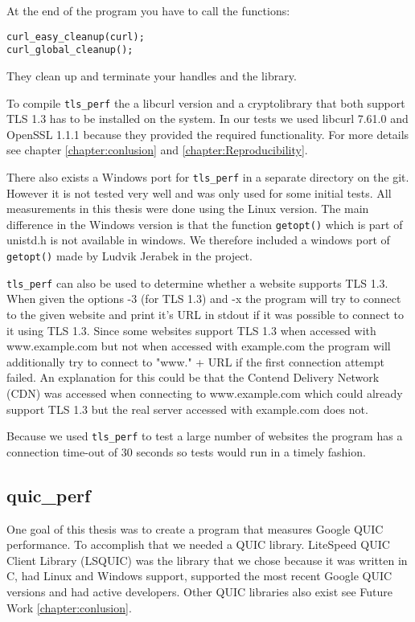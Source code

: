 At the end of the program you have to call the functions:
\begin{lstlisting}
curl_easy_cleanup(curl);
curl_global_cleanup();
\end{lstlisting}
They clean up and terminate your handles and the library.

To compile  \texttt{tls\_perf} the a libcurl version and a cryptolibrary that both support TLS 1.3 has to be installed on the system.
In our tests we used libcurl 7.61.0 and OpenSSL 1.1.1 because they provided the required functionality. For more details see chapter  \ref{chapter:conlusion} and \ref{chapter:Reproducibility}.

There also exists a Windows port for  \texttt{tls\_perf} in a separate directory on the git.
However it is not tested very well and was only used for some initial tests.
All measurements in this thesis were done using the Linux version.
The main difference in the Windows version is that the function \verb|getopt()| which is part of unistd.h is not available in windows.
We therefore included a windows port of \verb|getopt()| made by Ludvik Jerabek \cite{Link:getopt} in the project.


 \texttt{tls\_perf} can also be used to determine whether a website supports TLS 1.3.
When given the options -3 (for TLS 1.3) and -x  the program will try to connect to the given website and print it's URL in stdout if it was possible to connect to it using TLS 1.3.
Since some websites support TLS 1.3 when accessed with www.example.com but not when accessed with example.com the program will additionally try to connect to "www." + URL if the first connection attempt failed.
An explanation for this could be that the Contend Delivery Network (CDN) was accessed when connecting to www.example.com which could already support TLS 1.3 but the real server accessed with example.com does not.


Because we used  \texttt{tls\_perf} to test a large number of websites the program has a connection time-out of 30 seconds so tests would run in a timely fashion.

\subsection{quic\_perf}
One goal of this thesis was to create a program that measures Google QUIC performance.
To accomplish that we needed a QUIC library.
LiteSpeed QUIC Client Library (LSQUIC) was the library that we chose because it was written in C, had Linux and Windows support, supported the most recent Google QUIC versions and had active developers.
Other QUIC libraries also exist see Future Work \ref{chapter:conlusion}.

